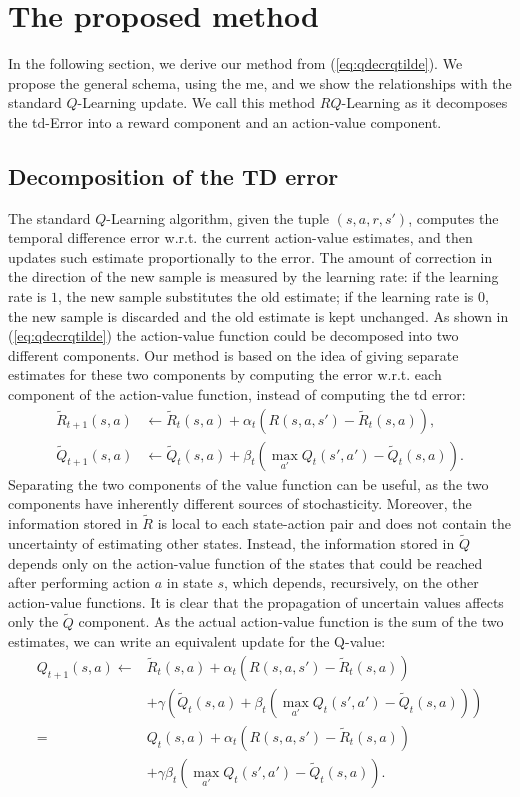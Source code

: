 \section{The proposed method}
In the following section, we derive our method from (\ref{eq:qdecrqtilde}). We propose the general schema, using the \gls{me}, and we show the relationships with the standard $Q$-Learning update. We call this method $RQ$-Learning as it decomposes the \gls{td}-Error into a reward component and an action-value component.

\subsection{Decomposition of the TD error}
The standard $Q$-Learning algorithm, given the tuple $(s,a,r,s')$, computes the temporal difference error w.r.t. the current action-value estimates, and then updates such estimate proportionally to the error. The amount of correction in the direction of the new sample is measured by the learning rate: if the learning rate is $1$, the new sample substitutes the old estimate; if the learning rate is $0$, the new sample is discarded and the old estimate is kept unchanged. 
As shown in (\ref{eq:qdecrqtilde}) the action-value function could be decomposed into two different components. Our method is based on the idea of giving separate estimates for these two components by computing the error w.r.t. each component of the action-value function, instead of computing the \gls{td} error:
\begin{align}
\tilde{R}_{t+1}(s,a) & \leftarrow\tilde{R}_t(s,a)+\alpha_t(R(s,a,s')-\tilde{R}_t(s,a)), \label{eq:rtilupdedate}\\
\tilde{Q}_{t+1}(s,a) & \leftarrow\tilde{Q}_t(s,a)+\beta_t(\max_{a'}Q_t(s',a')-\tilde{Q}_t(s,a)).
\label{eq:qtildeupdate}
\end{align}
Separating the two components of the value function can be useful, as the two components have inherently different sources of stochasticity. Moreover, the information stored in $\tilde{R}$ is local to each state-action pair and does not contain the uncertainty of estimating other states. Instead, the information stored in $\tilde{Q}$ depends only on the action-value function of the states that could be reached after performing action $a$ in state $s$, which depends, recursively, on the other action-value functions. It is clear that the propagation of uncertain values affects only the $\tilde{Q}$ component.
As the actual action-value function is the sum of the two estimates, we can write an equivalent update for the Q-value:
\begin{align}
Q_{t+1}(s,a)\leftarrow&\tilde{R}_t(s,a)+\alpha_t(R(s,a,s')-\tilde{R}_t(s,a)) \nonumber\\
  & +\gamma\left(\tilde{Q}_t(s,a)+\beta_t(\max_{a'}Q_t(s',a')-\tilde{Q}_t(s,a))\right) \nonumber\\
= & Q_t(s,a)+\alpha_t(R(s,a,s')-\tilde{R}_t(s,a)) \nonumber\\
  & +\gamma\beta_t(\max_{a'}Q_t(s',a')-\tilde{Q}_t(s,a)).
 \label{eq:cumulativeupdate}
\end{align}

